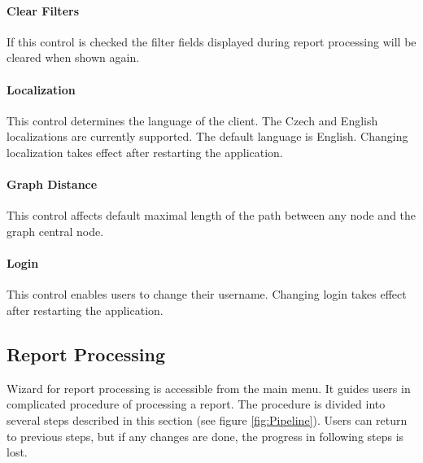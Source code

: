 \paragraph{Clear Filters} If this control is checked the filter fields
displayed during report processing will be cleared when shown again.

\paragraph{Localization} This control determines the language of the \textan{}
client. The Czech and English localizations are currently supported. The
default language is English. Changing localization takes effect after
restarting the application.

\paragraph{Graph Distance} This control affects default maximal length of the
path between any node and the graph central node.

\paragraph{Login} This control enables users to change their username. Changing
login takes effect after restarting the application.

\subsection{Report Processing}
\label{ssec:ProcessReport}

Wizard for report processing is accessible from the main menu. It guides
users in complicated procedure of processing a report. The procedure is divided
into several steps described in this section (see figure \ref{fig:Pipeline}).
Users can return to previous steps, but if any changes are done, the progress
in following steps is lost.

